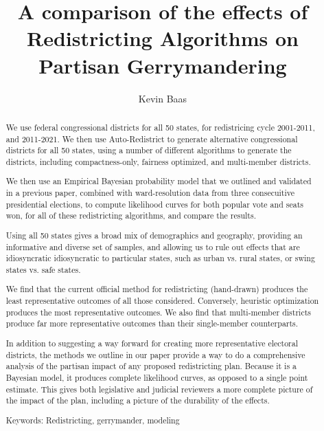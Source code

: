 \documentclass[preprint,12pt]{article}
\begin{document}
\title{A comparison of the effects of Redistricting Algorithms on Partisan Gerrymandering}

\author{Kevin Baas}

\maketitle

\begin{abstract}
We use federal congressional districts for all 50 states, for redistricing cycle 2001-2011, and 2011-2021.  We then use Auto-Redistrict to generate alternative congressional districts for all 50 states, using a number of different algorithms to generate the districts, including compactness-only, fairness optimized, and multi-member districts.

We then use an Empirical Bayesian probability model that we outlined and validated in a previous paper, combined with ward-resolution data from three consecuitive presidential elections, to compute likelihood curves for both popular vote and seats won, for all of these redistricting algorithms, and compare the results.

Using all 50 states gives a broad mix of demographics and geography, providing an informative and diverse set of samples, and allowing us to rule out effects that are idiosyncratic idiosyncratic to particular states, such as urban vs. rural states, or swing states vs. safe states.

We find that the current official method for redistricting (hand-drawn) produces the least representative outcomes of all those considered.  Conversely, heuristic optimization produces the most representative outcomes.  We also find that multi-member districts produce far more representative outcomes than their single-member counterparts.

In addition to suggesting a way forward for creating more representative electoral districts, the methods we outline in our paper provide a way to do a comprehensive analysis of the partisan impact of any proposed redistricting plan.  Because it is a Bayesian model, it produces complete likelihood curves, as opposed to a single point estimate.  This gives both legislative and judicial reviewers a more complete picture of the impact of the plan, including a picture of the durability of the effects.

Keywords: Redistricting, gerrymander, modeling

\end{abstract}
\end{document}
